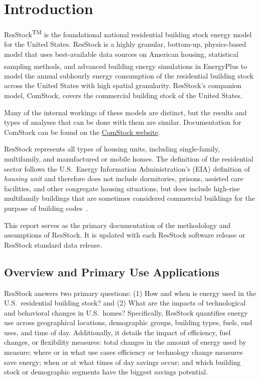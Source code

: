 \chapter{Introduction}

ResStock\textsuperscript{TM} is the foundational national residential building stock energy model for the United States. ResStock is a highly granular, bottom-up, physics-based model that uses best-available data sources on American housing, statistical sampling methods, and advanced building energy simulations in EnergyPlus\textsuperscript{\textregistered} to model the annual subhourly energy consumption of the residential building stock across the United States with high spatial granularity. ResStock's companion model, ComStock, covers the commercial building stock of the United States.

Many of the internal workings of these models are distinct, but the results and types of analyses that can be done with them are similar. Documentation for ComStock can be found on the \href{https://natlabrockies.github.io/ComStock.github.io/}{ComStock website}.

ResStock represents all types of housing units, including single-family, multifamily, and manufactured or mobile homes. The definition of the residential sector follows the U.S.~Energy Information Administration's (EIA) definition of \textit{housing unit} and therefore does not include dormitories, prisons, assisted care facilities, and other congregate housing situations, but does include high-rise multifamily buildings that are sometimes considered commercial buildings for the purpose of building codes~\citep{eia_recs2024}.

This report serves as the primary documentation of the methodology and assumptions of ResStock. It is updated with each ResStock software release or ResStock standard data release.

\section{Overview and Primary Use Applications}

ResStock answers two primary questions: (1) How and when is energy used in the U.S.~residential building stock? and (2) What are the impacts of technological and behavioral changes in U.S.~homes? Specifically, ResStock quantifies energy use across geographical locations, demographic groups, building types, fuels, end uses, and time of day. Additionally, it details the impact of efficiency, fuel changes, or flexibility measures: total changes in the amount of energy used by measure; where or in what use cases efficiency or technology change measures save energy; when or at what times of day savings occur; and which building stock or demographic segments have the biggest savings potential.

